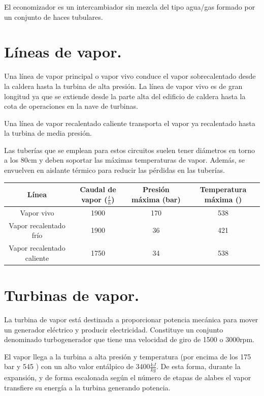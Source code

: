 El economizador es un intercambiador sin mezcla del tipo agua/gas formado por un conjunto de
haces tubulares.

\section{Líneas de vapor.}
Una línea de vapor principal o vapor vivo conduce el vapor sobrecalentado desde la caldera hasta la turbina
de alta presión. La línea de vapor vivo es de gran longitud ya que se extiende desde la parte alta del
edificio de caldera hasta la cota de operaciones en la nave de turbinas.



Una línea de vapor recalentado caliente transporta el vapor ya recalentado hasta la turbina de media presión.



Las tuberías que se emplean para estos circuitos suelen tener diámetros en torno a los 80cm y deben soportar las máximas temperaturas de vapor. Además, se envuelven en aislante térmico para reducir las pérdidas en las tuberías.

\begin{table}[H]
	\centering
	\renewcommand{\arraystretch}{1.5}
	\begin{tabular}{cccc}
		\hline
		Línea&Caudal de vapor ($\frac{t}{h}$)&Presión máxima (bar)&Temperatura máxima (\grado)\\
		\hline
		Vapor vivo&1900&170&538\\
		\hline
		Vapor recalentado frío&1900&36&421\\
		\hline
		Vapor recalentado caliente&1750&34&538\\
		\hline
	\end{tabular}
\end{table}
\section{Turbinas de vapor.}
La turbina de vapor está destinada a proporcionar potencia mecánica para
mover un generador eléctrico y producir electricidad. Constituye un conjunto denominado
turbogenerador que tiene una velocidad de giro de 1500 o 3000rpm.


El vapor llega a la turbina a alta presión y temperatura (por encima de los 175 bar y 545 \grado) con un alto valor entálpico de 3400$\frac{kJ}{kg}$. De esta forma, durante la expansión, y de forma escalonada según el número de etapas de alabes el vapor transfiere su energía a la turbina generando potencia. 





